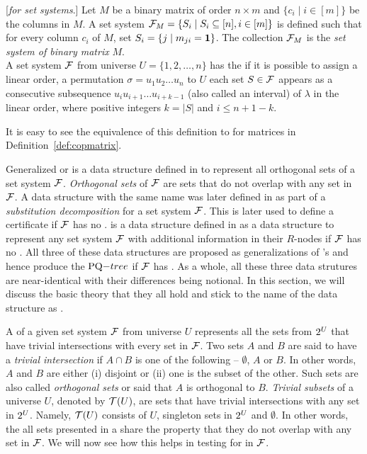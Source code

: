 \begin{definition}%
  \label{def:matrixsetsystem}%
  [\emph{\Cop for set systems}.]  Let $M$ be a binary matrix of order
  $n \times m$ %
  and $\{c_i \mid i \in [m]\}$ be the columns in $M$. A set system
  ${\cal F}_{M} = \{S_i \mid S_i \subseteq [n], i \in [m]\}$ is defined
  such that for every column $c_i$ of $M$, set $S_i = \{j \mid m_{ji}
  = \textbf{1} \}$. The collection ${\cal F}_M$ is the {\em set system of binary
    matrix} $M$.\\
  A set system ${\cal F}$ from universe $U = \{1, 2, \ldots, n\}$ has the
  {\em \cop} if it is possible to assign a linear order, \ie a
  permutation $\sigma = u_1u_2\ldots u_n$ to $U$ \stt each set $S \in
  {\cal F}$ appears as a consecutive subsequence $u_{i}u_{i+1}\ldots
  u_{i+k-1}$ (also called an interval) of $\lambda$ in the linear order, where
  positive integers $k = |S|$ and $i \le n+1-k$.
\end{definition}

It is easy to see the equivalence of this definition to \COP for
matrices in Definition~\ref{def:copmatrix}.

Generalized \PQtree or \gPQtree is a data structure defined in \cite{n89} to
represent all orthogonal sets of a set system ${\cal F}$. {\em Orthogonal
  sets} of ${\cal F}$ are sets that do not overlap with any set in ${\cal F}$. A
data structure with the same name was later defined in \cite{mcc04} as
part of a {\em substitution decomposition} for a set system
${\cal F}$.  This is later used to define
a certificate if ${\cal F}$ has no \COP. \PQRtree is a data structure
defined in \cite{mm96} as a data structure to represent any set system
${\cal F}$ with additional information in their $R$-nodes if ${\cal F}$ has no
\COP.  All three of these data structures are proposed as
generalizations of \cite{bl76}'s \PQtree and hence produce the
$\PQtree$ if ${\cal F}$ has \COP. As a whole, all these three data
strutures are near-identical with their differences being notional.
In this section, we will discuss the basic theory that they all hold
and stick to the name of the data structure as \PQRtree.

A \PQRtree of a given set system ${\cal F}$ from universe $U$ represents
all the sets from $2^{U}$ that have trivial intersections with
every set in ${\cal F}$.  Two sets $A$ and $B$ are said to have a {\em
  trivial intersection} if $A \cap B$ is one of the following --
$\emptyset$, $A$ or $B$. In other words, $A$ and $B$ are either (i)
disjoint or (ii) one is the subset of the other. Such sets are also
called {\em orthogonal sets} or said that $A$ is orthogonal to
$B$. {\em Trivial subsets} of a universe $U$, denoted by ${\cal T}(U)$, are
sets that have trivial intersections with any set in
$2^{U}$. Namely, ${\cal T}(U)$ consists of $U$, singleton sets in
$2^{U}$ and $\emptyset$\cite{n89, mm96}.  In other words, the all
sets presented in a \PQRtree share the property that they do not
overlap with any set in ${\cal F}$. We will now see how this helps in
testing for \COP in ${\cal F}$.

